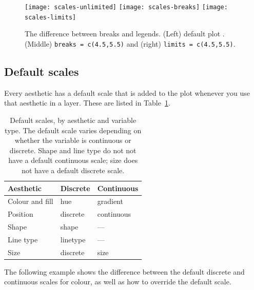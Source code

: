\begin{figure}[htbp]
  \centering
    \texttt{[image: scales-unlimited]}%
    \texttt{[image: scales-breaks]}%
    \texttt{[image: scales-limits]}
  \caption{The difference between breaks and legends.  (Left) default plot .  (Middle)  {\tt breaks = c(4.5,5.5)} and (right) {\tt limits = c(4.5,5.5)}.}
  \label{fig:breaks_vs_legends}
\end{figure}

\subsection{Default scales}
\label{sub:default_scales}

Every aesthetic has a default scale that is added to the plot whenever you use that aesthetic in a layer.  These are listed in Table~\ref{tbl:default-scales}.

\begin{table}
  \begin{center}
  \begin{tabular}{lll}
    \toprule
    Aesthetic & Discrete & Continuous \\
    \midrule
    Colour and fill & hue & gradient \\
    Position & discrete & continuous \\
    Shape & shape & --- \\
    Line type & linetype & --- \\
    Size & discrete  & size \\
    \bottomrule
  \end{tabular}
  \end{center}
  \caption{Default scales, by aesthetic and variable type.  The default scale varies depending on whether the variable is continuous or discrete.  Shape and line type do not not have a default continuous scale; size does not have a default discrete scale.}
  \label{tbl:default-scales}
\end{table}

The following example shows the difference between the default discrete and continuous scales for colour, as well as how to override the default scale.

% 

